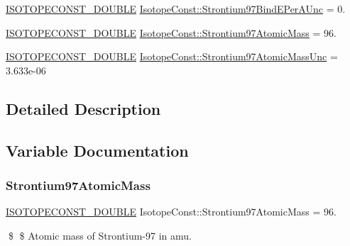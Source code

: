 \begin{DoxyCompactItemize}
\mbox{\hyperlink{group___isotope_const-_macros_ga8f45a7272ce02c0b4c65c44636ed719a}{I\+S\+O\+T\+O\+P\+E\+C\+O\+N\+S\+T\+\_\+\+D\+O\+U\+B\+LE}} \mbox{\hyperlink{group___isotope_const-_strontium-_sr97_gaf9f5b4ad6a92d2810e0110b5ce2acae4}{Isotope\+Const\+::\+Strontium97\+Bind\+E\+Per\+A\+Unc}} = 0.
\item 
\mbox{\hyperlink{group___isotope_const-_macros_ga8f45a7272ce02c0b4c65c44636ed719a}{I\+S\+O\+T\+O\+P\+E\+C\+O\+N\+S\+T\+\_\+\+D\+O\+U\+B\+LE}} \mbox{\hyperlink{group___isotope_const-_strontium-_sr97_ga570ed9480326ddeca0f0a56a63b80614}{Isotope\+Const\+::\+Strontium97\+Atomic\+Mass}} = 96.
\item 
\mbox{\hyperlink{group___isotope_const-_macros_ga8f45a7272ce02c0b4c65c44636ed719a}{I\+S\+O\+T\+O\+P\+E\+C\+O\+N\+S\+T\+\_\+\+D\+O\+U\+B\+LE}} \mbox{\hyperlink{group___isotope_const-_strontium-_sr97_gaa3e96a5feaaabfccbae4e7a6010abd5c}{Isotope\+Const\+::\+Strontium97\+Atomic\+Mass\+Unc}} = 3.\+633e-\/06
\end{DoxyCompactItemize}


\subsection{Detailed Description}


\subsection{Variable Documentation}
\mbox{\label{group___isotope_const-_strontium-_sr97_ga570ed9480326ddeca0f0a56a63b80614}} 
\subsubsection{\texorpdfstring{Strontium97\+Atomic\+Mass}{Strontium97AtomicMass}}
{\footnotesize\ttfamily \mbox{\hyperlink{group___isotope_const-_macros_ga8f45a7272ce02c0b4c65c44636ed719a}{I\+S\+O\+T\+O\+P\+E\+C\+O\+N\+S\+T\+\_\+\+D\+O\+U\+B\+LE}} Isotope\+Const\+::\+Strontium97\+Atomic\+Mass = 96.}

\$ \$ Atomic mass of Strontium-\/97 in amu. \mbox{\label{group___isotope_const-_strontium-_sr97_gaa3e96a5feaaabfccbae4e7a6010abd5c}} 
